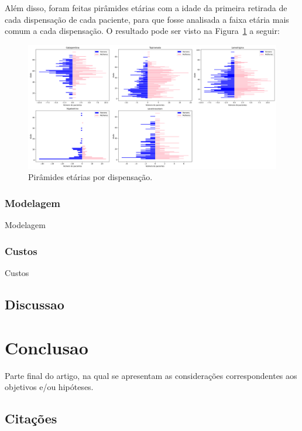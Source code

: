 \documentclass[article,a4paper,12pt,brazil,sumario=tradicional]{abntex2}
\begin{document}
Além disso, foram feitas pirâmides etárias com a idade da primeira retirada de cada dispensação de cada paciente, para que fosse analisada a faixa etária mais comum a cada dispensação. O resultado pode ser visto na Figura~\ref{fig:grid_piramides_etarias_medicamento} a seguir:

\begin{figure}[!ht]
    \centering
    \includegraphics[width=1\textwidth]{grid_piramides_etarias_medicamento.png}
    \caption{Pirâmides etárias por dispensação.}
    \label{fig:grid_piramides_etarias_medicamento}
\end{figure}

\subsubsection{Modelagem}


Modelagem

\subsubsection{Custos}

Custos

\subsection{Discussao}

\section{Conclusao}

Parte final do artigo, na qual se apresentam as considerações correspondentes aos objetivos e/ou hipóteses.

\subsection{Citações}
\end{document}
